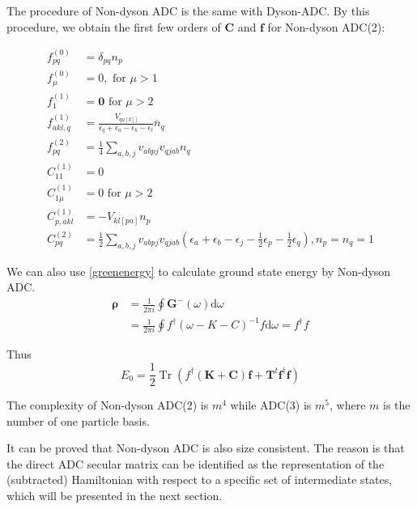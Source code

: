 The procedure of Non-dyson ADC is the same with Dyson-ADC.
By this procedure, we obtain the first few orders of $\boldsymbol{C}$ and $\boldsymbol{f}$ for Non-dyson ADC(2):

\begin{equation}
	\begin{aligned}
		f_{p q}^{(0)}&=\delta_{p q} n_{p}
		\\
		f_{\mu}^{(0)}&=0, \text { for } \mu>1
		\\
		f_{1}^{(1)}&=\mathbf{0} \text { for } \mu>2
		\\
		f_{a k l, q}^{(1)}&=\frac{V_{q a[k] ]}}{\epsilon_{q}+\epsilon_{a}-\epsilon_{k}-\epsilon_{l}} \overline{n}_{q}
		\\
		f_{p q}^{(2)}&=\frac{1}{4} \sum_{a, b, j} v_{a b p j} v_{q j a b} n_{q}
		\\
		C_{11}^{(1)}&=0
		\\
		C_{1 \mu}^{(1)}&=0 \text { for } \mu>2
		\\
		C_{p, a k l}^{(1)}&=-V_{k l[p a]} n_{p}
		\\
		C_{p q}^{(2)}&=\frac{1}{2} \sum_{a, b, j} v_{a b p j} v_{q j a b}\left(\epsilon_{a}+\epsilon_{b}-\epsilon_{j}-\frac{1}{2} \epsilon_{p}-\frac{1}{2} \epsilon_{q}\right), n_{p}=n_{q}=1
	\end{aligned}
\end{equation}

We can also use \ref{greenenergy} to calculate ground state energy by Non-dyson ADC.
\begin{equation}
	\begin{aligned}
		\boldsymbol{\rho}&=\frac{1}{2 \pi i} \oint \boldsymbol{G}^{-}(\omega) \mathrm{d} \omega
		\\
		&=\frac{1}{2 \pi i} \oint f^{\dagger}(\omega-K-C)^{-1} f \mathrm{d} \omega=f^{\dagger} f
	\end{aligned}
\end{equation}

Thus
\begin{equation}
	E_{0}=\frac{1}{2} \operatorname{Tr}\left(f^{\dagger}(\boldsymbol{K}+\boldsymbol{C}) \boldsymbol{f}+\boldsymbol{T}^{t} \boldsymbol{f}^{\dagger} \boldsymbol{f}\right)
\end{equation}

The complexity of Non-dyson ADC(2) is $m^4$ while ADC(3) is $m^5$, where $m$ is the number of one particle basis.

It can be proved that Non-dyson ADC is also size consistent.
The reason is that the direct ADC secular matrix can be identified as the representation of the (subtracted) Hamiltonian with respect to a specific set of intermediate states, which will be presented in the next section.

